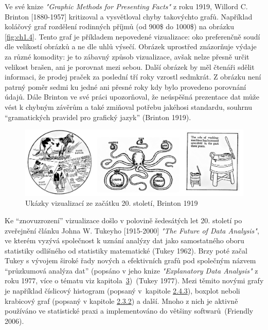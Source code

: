 \documentclass[12pt,]{article}
\begin{document}
\qquad Ve své knize \textit{"Graphic Methods for Presenting Facts"} z
roku 1919, Willord C. Brinton {[}1880-1957{]} kritizoval a vysvětloval
chyby takovýchto grafů. Například koláčový graf rozdělení rodinných
příjmů (od 900\$ do 1000\$) na obrázku \ref{fig:ch1.4}. Tento graf je
příkladem nepovedené vizualizace: oko preferenčně soudí dle velikostí
obrázků a ne dle uhlů výsečí. Obrázek uprostřed znázorňuje výdaje za
různé komodity: je to zábavný způsob vizualizace, avšak nelze přesně
určit velikost brašen, ani je porovnat mezi sebou. Další obrázek by měl
čtenáři sdělit informaci, že prodej praček za poslední tří roky vzrostl
sedmkrát. Z obrázku není patrný poměr sedmi ku jedné ani přesné roky kdy
bylo provedeno porovnání údajů. Dále Brinton ve své práci upozorňoval,
že neúspěšná prezentace dat může vést k chybným závěrům a také zmiňoval
potřebu jakéhosi standardu, souhrnu \enquote{gramatických pravidel pro
grafický jazyk} (Brinton 1919).

\begin{figure}[H]

{\centering \includegraphics[width=1\linewidth]{fig/brinton} 

}

\caption{\label{fig:ch1.4} Ukázky vizualizací ze začátku 20. století, Brinton 1919}\label{fig:brinton}
\end{figure}

\newpage

\qquad Ke \enquote{znovuzrození} vizualizace došlo v polovině šedesátých
let 20. století po zveřejnění článku Johna W. Tukeyho {[}1915-2000{]}
\textit{"The Future of Data Analysis"}, ve kterém vyzývá společnost k
uznání analýzy dat jako samostatného oboru statistiky odlišného od
statistiky matematické (Tukey 1962). Brzy poté začal Tukey s vývojem
široké řady nových a efektivních grafů pod společným názvem
\enquote{průzkumová analýza dat} (popsáno v jeho knize
\textit{"Explanatory Data Analysis"} z roku 1977, více o tématu viz
kapitola~\protect\hyperlink{EDA}{3})~(Tukey 1977). Mezi těmito novými
grafy je například číslicový histogram (popsaný v~kapitole
\protect\hyperlink{stem-and-leaf}{2.4.3}), boxplot neboli krabicový graf
(popsaný v kapitole \protect\hyperlink{boxplot}{2.3.2}) a další. Mnoho z
nich je aktivně používáno ve statistické praxi a implementováno do
většiny softwarů~(Friendly 2006).
\end{document}
